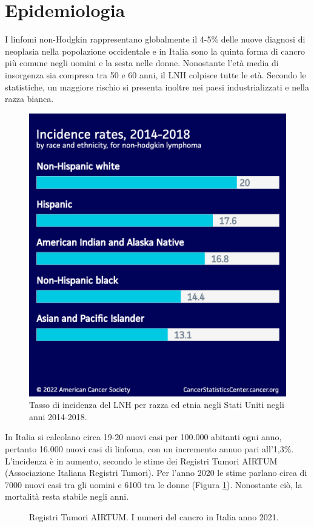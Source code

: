 \section{Epidemiologia}
I linfomi non-Hodgkin rappresentano globalmente il 4-5\% delle nuove diagnosi di neoplasia nella popolazione 
occidentale e in Italia sono la quinta forma di cancro più comune negli uomini e la sesta nelle donne\cite{AIOM}. 
Nonostante l’età media di insorgenza sia compresa tra 50 e 60 anni, il LNH colpisce tutte le età.
Secondo le statistiche, un maggiore rischio si presenta inoltre nei paesi industrializzati e nella razza 
bianca\cite{AMERICANCS}.

\begin{figure}[H]
    \begin{center}
    \includegraphics[width=0.3\columnwidth]{img/Incidencerates2014-18race-ethnicity.png}
    \vspace{-3mm}
    \end{center}
    \caption{Tasso di incidenza del LNH per razza ed etnia negli Stati Uniti negli anni 2014-2018.
    \cite{Americanstatistic}}

\end{figure}

In Italia si calcolano circa 19-20 nuovi casi per 100.000 abitanti ogni anno, pertanto 16.000 nuovi casi di linfoma, 
con un incremento annuo pari all’1,3\%\cite{AIOM}.\\
L’incidenza è in aumento, secondo le stime dei Registri Tumori AIRTUM (Associazione Italiana Registri Tumori).
Per l’anno 2020 le stime parlano circa di 7000 nuovi casi tra gli uomini e 6100 tra le donne (Figura \ref{fig:FIGURE_2.3}). 
Nonostante ciò, la mortalità resta stabile negli anni\cite{AIRC}.

\begin{figure}[H]
    \begin{center}
    \vspace{-3mm}
    \end{center}
    \caption{Registri Tumori AIRTUM. I numeri del cancro in Italia anno 2021.
    \cite{img4-6-7}}
    \label{fig:FIGURE_2.3}
\end{figure}

